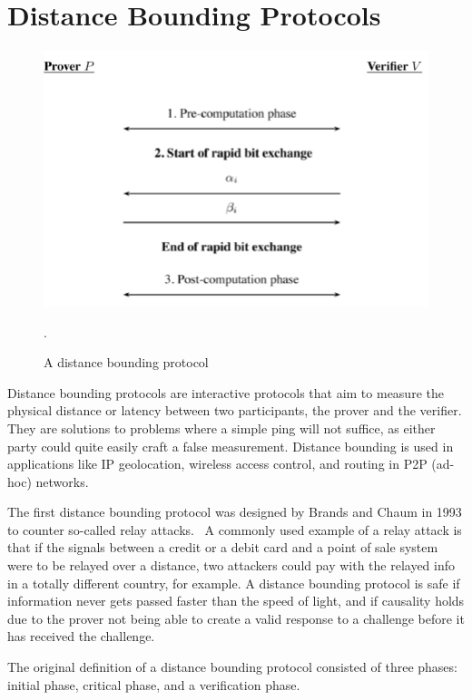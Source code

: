 \section{Distance Bounding Protocols}
\begin{figure}
  \includegraphics[width=\textwidth]{pictures/distance_bounding.png}
  \caption{A distance bounding protocol~\cite{Peeters2011-dq}}.
  \label{Distance Bounding Protocol}
\end{figure}
Distance bounding protocols are interactive protocols that aim to measure the physical distance or latency between two participants, the prover and the verifier. They are solutions to problems where a simple ping will not suffice, as either party could quite easily craft a false measurement. Distance bounding is used in applications like IP geolocation, wireless access control, and routing in P2P (ad-hoc) networks.

The first distance bounding protocol was designed by Brands and Chaum in 1993 to counter so-called relay attacks.~\cite{Boureanu_undated-bn, Brands1994-hz} A commonly used example of a relay attack is that if the signals between a credit or a debit card and a point of sale system were to be relayed over a distance, two attackers could pay with the relayed info in a totally different country, for example. A distance bounding protocol is safe if information never gets passed faster than the speed of light, and if causality holds due to the prover not being able to create a valid response to a challenge before it has received the challenge.~\cite{Boureanu_undated-bn}

The original definition of a distance bounding protocol consisted of three phases: initial phase, critical phase, and a verification phase.~\cite{Brands1994-hz, Mauw2018-uz} 

